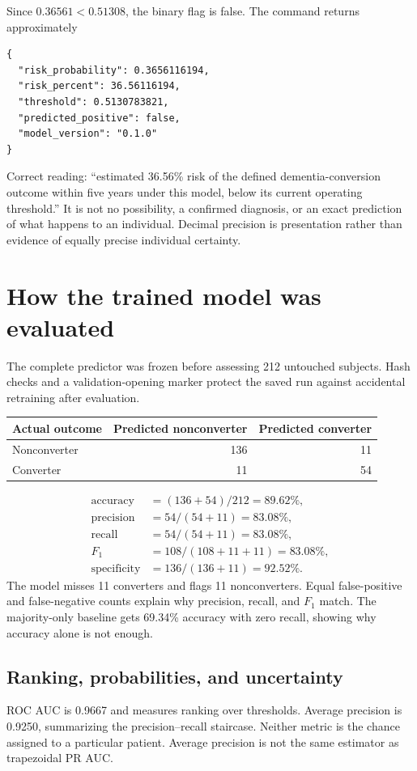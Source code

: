 Since $0.36561<0.51308$, the binary flag is false. The command returns approximately
\begin{verbatim}
{
  "risk_probability": 0.3656116194,
  "risk_percent": 36.56116194,
  "threshold": 0.5130783821,
  "predicted_positive": false,
  "model_version": "0.1.0"
}
\end{verbatim}
Correct reading: ``estimated 36.56\% risk of the defined dementia-conversion outcome within five years under this model, below its current operating threshold.'' It is not no possibility, a confirmed diagnosis, or an exact prediction of what happens to an individual. Decimal precision is presentation rather than evidence of equally precise individual certainty.
\clearpage

\section{How the trained model was evaluated}
The complete predictor was frozen before assessing 212 untouched subjects. Hash checks and a validation-opening marker protect the saved run against accidental retraining after evaluation.

\begin{center}\begin{tabular}{lrr}\toprule
Actual outcome & Predicted nonconverter & Predicted converter\\\midrule
Nonconverter & 136 & 11\\
Converter & 11 & 54\\\bottomrule
\end{tabular}\end{center}
\begin{align}
\mathrm{accuracy}&=(136+54)/212=89.62\%,\\
\mathrm{precision}&=54/(54+11)=83.08\%,\\
\mathrm{recall}&=54/(54+11)=83.08\%,\\
F_1&=108/(108+11+11)=83.08\%,\\
\mathrm{specificity}&=136/(136+11)=92.52\%.
\end{align}
The model misses 11 converters and flags 11 nonconverters. Equal false-positive and false-negative counts explain why precision, recall, and $F_1$ match. The majority-only baseline gets 69.34\% accuracy with zero recall, showing why accuracy alone is not enough.

\subsection{Ranking, probabilities, and uncertainty}
ROC AUC is 0.9667 and measures ranking over thresholds. Average precision is 0.9250, summarizing the precision--recall staircase. Neither metric is the chance assigned to a particular patient. Average precision is not the same estimator as trapezoidal PR AUC.

